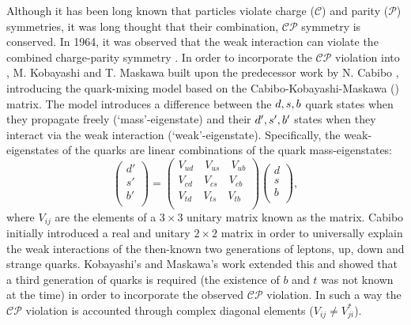 Although it has been long known that particles violate charge ($\mathcal{C}$) and parity ($\mathcal{P}$) symmetries,
it was long thought that their combination, $\mathcal{CP}$ symmetry is conserved.
In 1964, it was observed that the weak interaction can violate the combined charge-parity symmetry \cite{Christenson:1964fg}.
In order to incorporate the $\mathcal{CP}$ violation into \SM, M. Kobayashi and T. Maskawa \cite{Kobayashi:1973fv} built upon the predecessor work by N. Cabibo \cite{Cabibbo:1963yz},
introducing the quark-mixing model based on the Cabibo-Kobayashi-Maskawa (\CKM) matrix. 
The model introduces a difference between the $d,s,b$ quark states when they propagate freely (`mass'-eigenstate) and their $d',s',b'$ states when they interact
via the weak interaction (`weak'-eigenstate).
Specifically, the weak-eigenstates of the quarks are linear combinations of the quark mass-eigenstates:
\begin{equation}
    \begin{pmatrix}
        d'\\
        s'\\
        b'\\
    \end{pmatrix}
    =
    \begin{pmatrix}
        V_{ud} \quad V_{us} \quad V_{ub}\\
        V_{cd} \quad V_{cs} \quad V_{cb}\\
        V_{td} \quad V_{ts} \quad V_{tb}\\
    \end{pmatrix}
    \begin{pmatrix}
        d\\
        s\\
        b\\
    \end{pmatrix},
\end{equation}
where $V_{ij}$ are the elements of a $3\times3$ unitary matrix known as the \CKM matrix.
Cabibo initially introduced a real and unitary $2\times2$ matrix in order to universally explain the weak interactions of
the then-known two generations of leptons, up, down and strange quarks.
Kobayashi's and Maskawa's work extended this and showed that a third generation of quarks is required 
(the existence of $b$ and $t$ was not known at the time) in order to incorporate the observed $\mathcal{CP}$ violation.
In such a way the $\mathcal{CP}$ violation is accounted through complex diagonal elements ($V_{ij}\neq V_{ji}^*$).

